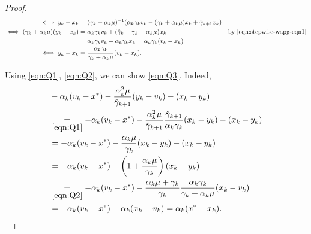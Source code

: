 \documentclass[12pt]{article}
\begin{document}
\begin{proof}
\begin{align*}
            \iff
            y_k - x_k &=
            (\gamma_k + \alpha_k \mu)^{-1}
            (\alpha_k \gamma_k v_k - (\gamma_k + \alpha_k \mu)x_k + \hat \gamma_{k + 1} x_k)
            \\
            \iff
            (\gamma_k + \alpha_k \mu)(y_k - x_k)
            &=
            \alpha_k\gamma _kv_k +
            (\hat \gamma_k - \gamma_k - \alpha_k \mu) x_k
            & \text{by \eqref{eqn:stepwise-wapg-eqn1}}
            \\
            &= \alpha_k \gamma_k v_k - \alpha_k \gamma_k x_k
            = \alpha_k \gamma_k(v_k - x_k)
            \\
            \iff
            y_k - x_k &=
            \frac{\alpha_k \gamma_k}{\gamma_k + \alpha_k \mu}(v_k - x_k).
        \end{align*}
        \par
        Using \eqref{eqn:Q1}, \eqref{eqn:Q2}, we can show \eqref{eqn:Q3}.
        Indeed,
        \begin{align*}
            &
            - \alpha_k(v_k - x^*) - \frac{\alpha_k^2 \mu}{\hat \gamma_{k + 1}}(y_k - v_k) - (x_k - y_k)
            \\
            & \underset{\eqref{eqn:Q1}}{=}
            -\alpha_k(v_k - x^*) -
            \frac{\alpha_k^2\mu}{\hat \gamma_{k + 1}}
            \frac{\hat \gamma_{k + 1}}{\alpha_k \gamma_k}(x_k - y_k)
            - (x_k - y_k)
            \\
            &=
            -\alpha_k(v_k - x^*) -
            \frac{\alpha_k \mu}{\gamma_k}(x_k - y_k)
            - (x_k - y_k)
            \\
            &=
            -\alpha_k(v_k - x^*) -
            \left(
                1 + \frac{\alpha_k \mu}{\gamma_k}
            \right)(x_k - y_k)
            \\
            &\underset{\eqref{eqn:Q2}}{=}
            -\alpha_k(v_k - x^*) -
            \frac{\alpha_k \mu + \gamma_k}{\gamma_k}
            \frac{\alpha_k \gamma_k}{\gamma_k + \alpha_k \mu}(x_k - v_k)
            \\
            &=
            -\alpha_k(v_k - x^*)
            - \alpha_k(x_k - v_k)
            = \alpha_k(x^* - x_k).
        \end{align*}
    \end{proof}
\end{document}
